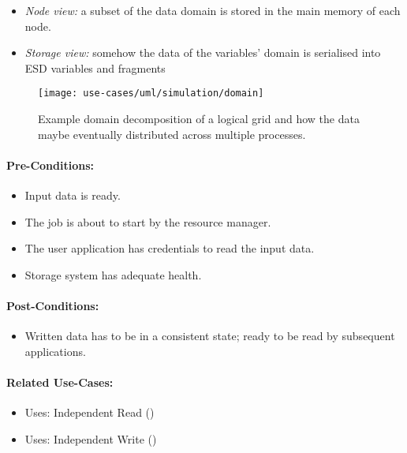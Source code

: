 \begin{itemize}
	\item \emph{Node view:} a subset of the data domain is stored in the main memory of each node.
	\item \emph{Storage view:} somehow the data of the variables' domain is serialised into ESD variables and fragments
\end{itemize}

\begin{figure}
	\centering
	\texttt{[image: use-cases/uml/simulation/domain]}
	\caption{Example domain decomposition of a logical grid and how the data maybe eventually distributed across multiple processes.}
	\label{fig:domain simulation}
\end{figure}



\paragraph{Pre-Conditions:}

\begin{itemize}
	\item Input data is ready.
	\item The job is about to start by the resource manager.
	\item The user application has credentials to read the input data.
	\item Storage system has adequate health.
\end{itemize}


\paragraph{Post-Conditions:}
\begin{itemize}
	\item Written data has to be in a consistent state; ready to be read by subsequent applications.
\end{itemize}


\paragraph{Related Use-Cases:}
\begin{itemize}
	\item Uses: Independent Read ()
	\item Uses: Independent Write ()
\end{itemize}

